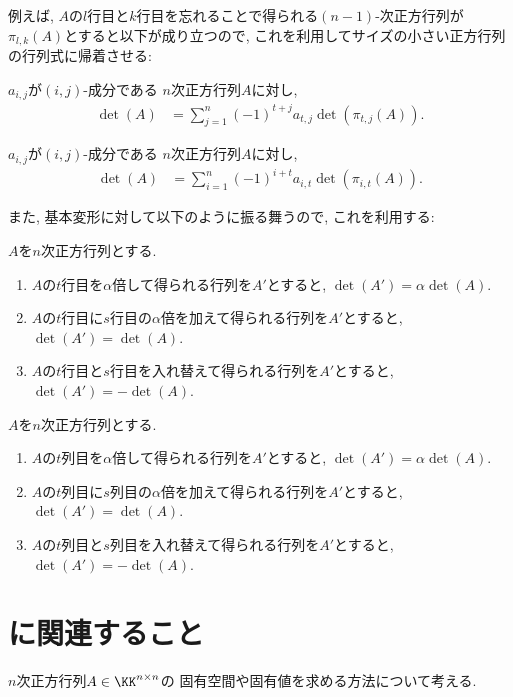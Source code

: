 例えば,
$A$の$l$行目と$k$行目を忘れることで得られる$(n-1)$-次正方行列が$\pi_{l,k}(A)$とすると以下が成り立つので,
これを利用してサイズの小さい正方行列の行列式に帰着させる:
\begin{theorem}
  \label{thm:det:row:expansion}
  $a_{i,j}$が$(i,j)$-成分である
    $n$次正方行列$A$に対し,
    \begin{align*}
      \det(A)&=
      \sum_{j=1}^{n}
      (-1)^{t+j}a_{t,j}\det(\pi_{t,j}(A)).
    \end{align*}
\end{theorem}
\begin{theorem}
  \label{thm:det:col:expansion}
  $a_{i,j}$が$(i,j)$-成分である
    $n$次正方行列$A$に対し,
    \begin{align*}
      \det(A)&=\sum_{i=1}^{n}
      (-1)^{i+t}a_{i,t}\det(\pi_{i,t}(A)).
    \end{align*}
\end{theorem}

また,
基本変形に対して以下のように振る舞うので,
これを利用する:
\begin{theorem}
  $A$を$n$次正方行列とする.
  \begin{enumerate}
  \item 

    $A$の$t$行目を$\alpha$倍して得られる行列を$A'$とすると,
    $\det(A')=\alpha \det(A)$.
  \item 
    $A$の$t$行目に$s$行目の$\alpha$倍を加えて得られる行列を$A'$とすると,
    $\det(A')=\det(A)$.
  \item 
    $A$の$t$行目と$s$行目を入れ替えて得られる行列を$A'$とすると,
    $\det(A')=-\det(A)$.
  \end{enumerate}
\end{theorem}
\begin{theorem}
  $A$を$n$次正方行列とする.
  \begin{enumerate}
  \item 
    $A$の$t$列目を$\alpha$倍して得られる行列を$A'$とすると,
    $\det(A')=\alpha \det(A)$.
  \item 
    $A$の$t$列目に$s$列目の$\alpha$倍を加えて得られる行列を$A'$とすると,
    $\det(A')=\det(A)$.
  \item 
    $A$の$t$列目と$s$列目を入れ替えて得られる行列を$A'$とすると,
    $\det(A')=-\det(A)$.
  \end{enumerate}
\end{theorem}


\section{に関連すること}
$n$次正方行列$A\in\KK^{n\times n}$の
固有空間や固有値を求める方法について考える.

